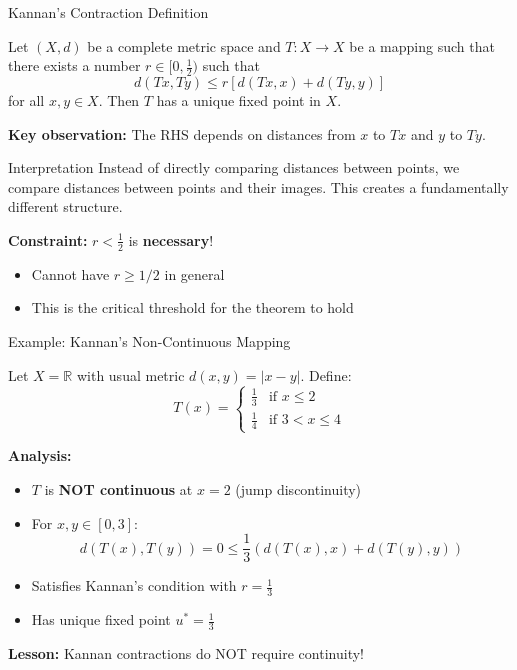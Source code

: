 \documentclass[aspectratio=169,10pt]{beamer}
\begin{document}
\begin{frame}{Kannan's Contraction Definition}
    \begin{theorem}
        Let $(X, d)$ be a complete metric space and $T : X \to X$ be a mapping such that
        there exists a number $r \in [0, \frac{1}{2})$ such that
        \[
            \boxed{d(Tx, Ty) \leq r[d(Tx, x) + d(Ty, y)]}
        \]
        for all $x, y \in X$. Then $T$ has a unique fixed point in $X$.
    \end{theorem}

    \vspace{0.3cm}
    \textbf{Key observation:} The RHS depends on distances from $x$ to $Tx$ and $y$ to $Ty$.

    \vspace{0.3cm}
    \begin{block}{Interpretation}
        Instead of directly comparing distances between points, we compare distances between
        points and their images. This creates a fundamentally different structure.
    \end{block}

    \vspace{0.2cm}
    \textbf{Constraint:} $r < \frac{1}{2}$ is \textbf{necessary}!
    \begin{itemize}
        \item Cannot have $r \geq 1/2$ in general
        \item This is the critical threshold for the theorem to hold
    \end{itemize}
\end{frame}

\begin{frame}{Example: Kannan's Non-Continuous Mapping}
    \begin{example}
        Let $X = \mathbb{R}$ with usual metric $d(x, y) = |x - y|$. Define:
        \[
            T(x) = \begin{cases}
                \frac{1}{3} & \text{if } x \leq 2 \\
                \frac{1}{4} & \text{if } 3 < x \leq 4
            \end{cases}
        \]
    \end{example}

    \vspace{0.2cm}
    \textbf{Analysis:}
    \begin{itemize}
        \item $T$ is \textbf{NOT continuous} at $x = 2$ (jump discontinuity)
        \item For $x, y \in [0, 3]$:
        \[
            d(T(x), T(y)) = 0 \leq \frac{1}{3}(d(T(x), x) + d(T(y), y))
        \]
        \item Satisfies Kannan's condition with $r = \frac{1}{3}$
        \item Has unique fixed point $u^* = \frac{1}{3}$
    \end{itemize}

    \vspace{0.2cm}
    \textbf{Lesson:} Kannan contractions do NOT require continuity!
\end{frame}
\end{document}
